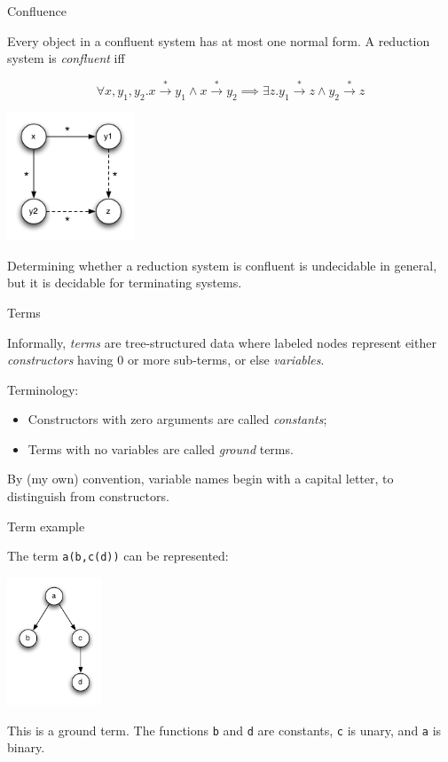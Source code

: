 \documentclass{beamer}
\begin{document}
\begin{frame}{Confluence}

Every object in a confluent system has at most one normal form. A reduction
system is \emph{confluent} iff

\[
\forall x,y_1,y_2 . 
x \xrightarrow{*} y_1 \land x \xrightarrow{*} y_2 \implies 
\exists z . y_1 \xrightarrow{*} z \land y_2 \xrightarrow{*} z
\]

\begin{center}
\includegraphics[width=1.5in]{images/confluence}
\end{center}

Determining whether a reduction system is confluent is undecidable in general,
but it is decidable for terminating systems.

\end{frame}


\begin{frame}{Terms}

Informally, \emph{terms} are tree-structured data where labeled nodes
represent either \emph{constructors} having 0 or more sub-terms, or else
\emph{variables}.

Terminology:

\begin{itemize}
  \item Constructors with zero arguments are called \emph{constants};
  \item Terms with no variables are called \emph{ground} terms.
\end{itemize}

By (my own) convention, variable names begin with a capital letter, to
distinguish from constructors.

\end{frame}


\begin{frame}{Term example}

The term \texttt{a(b,c(d))} can be represented:

\begin{center}
\includegraphics[height=1.5in]{images/example-term-1}
\end{center}

This is a ground term. The functions \texttt{b} and \texttt{d} are constants,
\texttt{c} is unary, and \texttt{a} is binary.

\end{frame}
\end{document}

